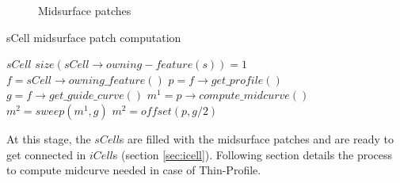 	
	\begin{figure}[!h]
	\centering     %
	 \quad
	\caption{Midsurface patches } %
	\label{fig_scells}
	\end{figure}
			
	\begin{algorithm}[!h]
		\caption{sCell midsurface patch computation}
		\label{alg_MidsurfsCell}
		\begin{algorithmic}
			\REQUIRE $sCell$
			\ENSURE $size(sCell \rightarrow owning-feature(s)) = 1$
			\STATE $f = sCell \rightarrow owning\_feature()$
			\STATE $p = f \rightarrow get\_profile()$
			\STATE $g = f \rightarrow get\_guide\_curve()$
				\STATE $m^1 = p\rightarrow compute\_midcurve()$
				\STATE $m^2 = sweep(m^1 ,g)$
			\ELSE
				\STATE $m^2 = offset(p ,g/2)$
			\ENDIF
		\end{algorithmic}
	\end{algorithm}
	
	

At this stage, the $sCell$s are filled with the midsurface patches and are ready to get connected in $iCell$s (section \ref{sec:icell}). Following section details the process to compute midcurve needed in case of Thin-Profile.

